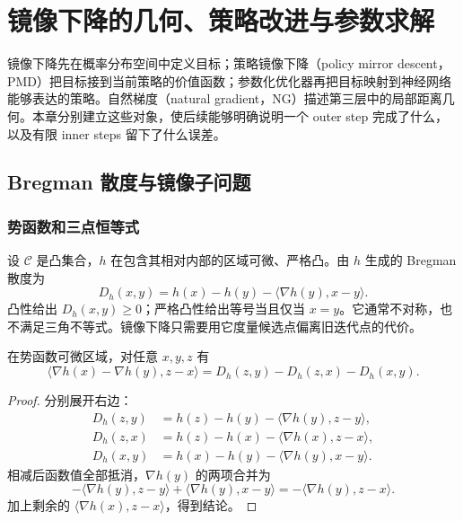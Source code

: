 \chapter{镜像下降的几何、策略改进与参数求解}
\label{ch:mirror-foundations}

镜像下降先在概率分布空间中定义目标；策略镜像下降（policy mirror descent，PMD）把目标接到当前策略的价值函数；参数化优化器再把目标映射到神经网络能够表达的策略。自然梯度（natural gradient，NG）描述第三层中的局部距离几何。本章分别建立这些对象，使后续能够明确说明一个 outer step 完成了什么，以及有限 inner steps 留下了什么误差。

\section{Bregman 散度与镜像子问题}

\subsection{势函数和三点恒等式}

设 $\mathcal C$ 是凸集合，$h$ 在包含其相对内部的区域可微、严格凸。由 $h$ 生成的 Bregman 散度为
\begin{equation}
 D_h(x,y)=h(x)-h(y)-\langle\nabla h(y),x-y\rangle.
 \label{eq:foundation-bregman}
\end{equation}
凸性给出 $D_h(x,y)\geq0$；严格凸性给出等号当且仅当 $x=y$。它通常不对称，也不满足三角不等式。镜像下降只需要用它度量候选点偏离旧迭代点的代价。

\begin{lemma}
\label{lem:foundation-three-point}
在势函数可微区域，对任意 $x,y,z$ 有
\begin{equation}
 \langle\nabla h(x)-\nabla h(y),z-x\rangle
 =D_h(z,y)-D_h(z,x)-D_h(x,y).
 \label{eq:foundation-three-point}
\end{equation}
\end{lemma}
\begin{proof}
分别展开右边：
\begin{align*}
 D_h(z,y)&=h(z)-h(y)-\langle\nabla h(y),z-y\rangle,\\
 D_h(z,x)&=h(z)-h(x)-\langle\nabla h(x),z-x\rangle,\\
 D_h(x,y)&=h(x)-h(y)-\langle\nabla h(y),x-y\rangle.
\end{align*}
相减后函数值全部抵消，$\nabla h(y)$ 的两项合并为
\[
 -\langle\nabla h(y),z-y\rangle+\langle\nabla h(y),x-y\rangle
 =-\langle\nabla h(y),z-x\rangle.
\]
加上剩余的 $\langle\nabla h(x),z-x\rangle$，得到结论。
\end{proof}

